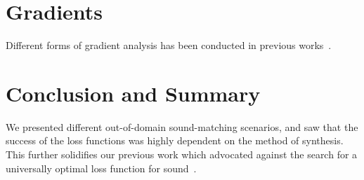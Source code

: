 \documentclass{article} %
\begin{document}
\section{Gradients}
Different forms of gradient analysis has been conducted in previous works~\cite{masuda2023improving,turian2020sorry,vahidi2023mesostructures}.


\section{Conclusion and Summary}
We presented different out-of-domain sound-matching scenarios, and saw that the success of the loss functions was highly dependent on the method of synthesis. This further solidifies our previous work which advocated against the search for a universally optimal loss function for sound~\cite{salimi2025soundmatching}.

\clearpage


\end{document}
